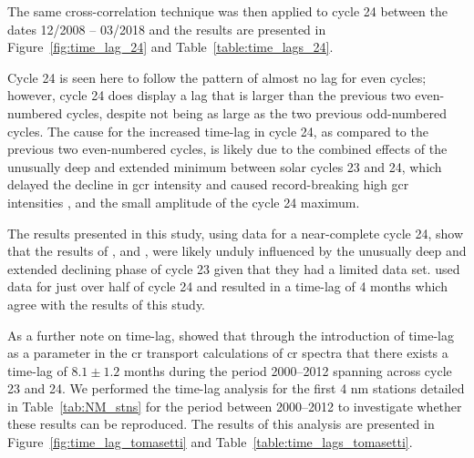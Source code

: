 The same cross-correlation technique was then applied to cycle 24 between the dates 12/2008 -- 03/2018 and the results are presented in Figure~\ref{fig:time_lag_24} and Table~\ref{table:time_lags_24}.


Cycle 24 is seen here to follow the pattern of almost no lag for even cycles; however, cycle 24 does display a lag that is larger than the previous two even-numbered cycles, despite not being as large as the two previous odd-numbered cycles. The cause for the increased time-lag in cycle 24, as compared to the previous two even-numbered cycles, is likely due to the combined effects of the unusually deep and extended minimum between solar cycles 23 and 24, which delayed the decline in \gls{gcr} intensity and caused record-breaking high \gls{gcr} intensities \citep{pacini_unusual_2015}, and the small amplitude of the cycle 24 maximum.

The results presented in this study, using data for a near-complete cycle 24, show that the results of \cite{kane_lags_2014}, and \cite{mishra_study_2016}, were likely unduly influenced by the unusually deep and extended declining phase of cycle 23 given that they had a limited data set. \cite{mishra_study_2016} used data for just over half of cycle 24 and resulted in a time-lag of 4 months which agree with the results of this study.

As a further note on time-lag, \cite{tomassetti_evidence_2017} showed that through the introduction of time-lag as a parameter in the \gls{cr} transport calculations of \gls{cr} spectra that there exists a time-lag of $8.1 \pm 1.2$ months during the period 2000--2012 spanning across cycle 23 and 24. We performed the time-lag analysis for the first 4 \gls{nm} stations detailed in Table~\ref{tab:NM_stns} for the period between 2000--2012 to investigate whether these results can be reproduced. The results of this analysis are presented in Figure~\ref{fig:time_lag_tomasetti} and Table~\ref{table:time_lags_tomasetti}.


